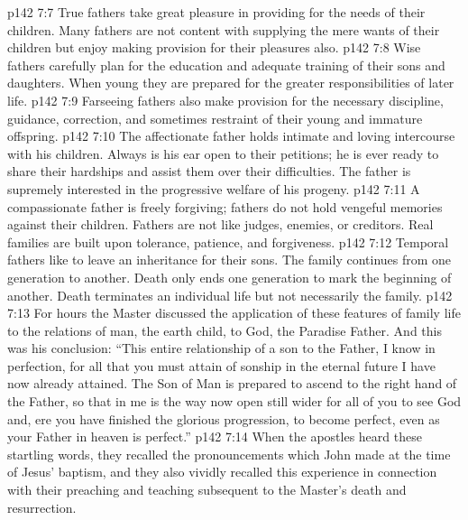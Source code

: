 \pc \vs p142 7:7 \bibnobreakspace {} True fathers take great pleasure in providing for the needs of their children. Many fathers are not content with supplying the mere wants of their children but enjoy making provision for their pleasures also.
\pc \vs p142 7:8 \bibnobreakspace {} Wise fathers carefully plan for the education and adequate training of their sons and daughters. When young they are prepared for the greater responsibilities of later life.
\pc \vs p142 7:9 \bibnobreakspace {} Farseeing fathers also make provision for the necessary discipline, guidance, correction, and sometimes restraint of their young and immature offspring.
\pc \vs p142 7:10 \bibnobreakspace {} The affectionate father holds intimate and loving intercourse with his children. Always is his ear open to their petitions; he is ever ready to share their hardships and assist them over their difficulties. The father is supremely interested in the progressive welfare of his progeny.
\pc \vs p142 7:11 \bibnobreakspace {} A compassionate father is freely forgiving; fathers do not hold vengeful memories against their children. Fathers are not like judges, enemies, or creditors. Real families are built upon tolerance, patience, and forgiveness.
\pc \vs p142 7:12 \bibnobreakspace {} Temporal fathers like to leave an inheritance for their sons. The family continues from one generation to another. Death only ends one generation to mark the beginning of another. Death terminates an individual life but not necessarily the family.
\pc \vs p142 7:13 For hours the Master discussed the application of these features of family life to the relations of man, the earth child, to God, the Paradise Father. And this was his conclusion: \textcolor{ubdarkred}{“This entire relationship of a son to the Father, I know in perfection, for all that you must attain of sonship in the eternal future I have now already attained. The Son of Man is prepared to ascend to the right hand of the Father, so that in me is the way now open still wider for all of you to see God and, ere you have finished the glorious progression, to become perfect, even as your Father in heaven is perfect.”}
\vs p142 7:14 When the apostles heard these startling words, they recalled the pronouncements which John made at the time of Jesus’ baptism, and they also vividly recalled this experience in connection with their preaching and teaching subsequent to the Master’s death and resurrection.
